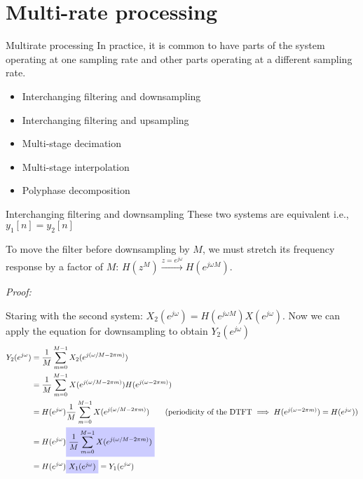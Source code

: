 \documentclass[10pt]{beamer}
\begin{document}
% 
\section{Multi-rate processing}
\begin{frame}{Multirate processing}
	In practice, it is common to have parts of the system operating at one sampling rate and other parts operating at a different sampling rate.
	\begin{itemize}
		\item Interchanging filtering and downsampling
		\item Interchanging filtering and upsampling
		\item Multi-stage decimation
		\item Multi-stage interpolation
		\item Polyphase decomposition
	\end{itemize}

\end{frame}

\begin{frame}{Interchanging filtering and downsampling}
	These two systems are equivalent i.e., $y_1[n] = y_2[n]$
	\begin{center}
		\resizebox{0.6\linewidth}{!}{}
	\end{center}	

	To move the filter before downsampling by $M$, we must stretch its frequency response by a factor of $M$: $H(z^M) \xrightarrow{z = e^{j\omega}} H(e^{j\omega M})$.
\end{frame}

\begin{frame}
	\textit{Proof:}
	
	Staring with the second system: $X_2(e^{j\omega}) = H(e^{j\omega M})X(e^{j\omega})$. Now we can apply the equation for downsampling to obtain $Y_2(e^{j\omega})$
	\begin{align*}
	Y_2(e^{j\omega}) &= \frac{1}{M}\sum_{m= 0}^{M-1} X_2(e^{j(\omega/M - 2\pi m)}) \\
	&=\frac{1}{M}\sum_{m= 0}^{M-1} X(e^{j(\omega/M - 2\pi m)})H(e^{j(\omega - 2\pi m)}) \\
	&=H(e^{j\omega})\frac{1}{M}\sum_{m= 0}^{M-1} X(e^{j(\omega/M - 2\pi m)}) \tag{periodicity of the DTFT $\implies H(e^{j(\omega - 2\pi m)}) = H(e^{j\omega})$} \\
	&=H(e^{j\omega})\tikz[baseline]{\node[fill=blue!20,anchor=base] {$\displaystyle\frac{1}{M}\sum_{m= 0}^{M-1} X(e^{j(\omega/M - 2\pi m)})$};} \\
	&=H(e^{j\omega})\tikz[baseline]{\node[fill=blue!20,anchor=base] {$X_1(e^{j\omega})$};} = Y_1(e^{j\omega})
	\end{align*}
\end{frame}
\end{document}
